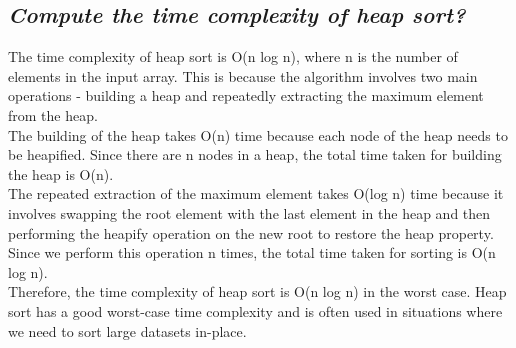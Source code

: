 \documentclass{article}
\begin{document}
\subsection{\textit{Compute the time complexity of heap sort?}}
The time complexity of heap sort is O(n log n), where n is the number of elements in the input array. This is because the algorithm involves two main operations - building a heap and repeatedly extracting the maximum element from the heap.\\

The building of the heap takes O(n) time because each node of the heap needs to be heapified. Since there are n nodes in a heap, the total time taken for building the heap is O(n).\\

The repeated extraction of the maximum element takes O(log n) time because it involves swapping the root element with the last element in the heap and then performing the heapify operation on the new root to restore the heap property. Since we perform this operation n times, the total time taken for sorting is O(n log n).\\

Therefore, the time complexity of heap sort is O(n log n) in the worst case. Heap sort has a good worst-case time complexity and is often used in situations where we need to sort large datasets in-place.
\end{document}
